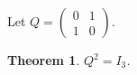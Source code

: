 \documentclass{article}
\newtheorem{theorem}{Theorem}
\begin{document}
Let $Q=\begin{pmatrix}0&1\\1&0\end{pmatrix}$.
\begin{theorem}\label{thm:heldout}
$Q^2=I_3$.
\end{theorem}
\end{document}
